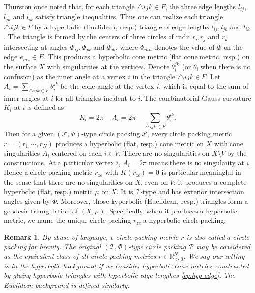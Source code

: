 \documentclass[12pt]{amsart}
\numberwithin{equation}{section}
\newtheorem{rem}[prop]{Remark}
\begin{document}
Thurston once noted \cite[Lemma~13.7.2]{Thurston} that, for each triangle $\triangle ijk \in F$, the three edge lengths $l_{ij}$,
$l_{jk}$ and $l_{ik}$ satisfy triangle inequalities. Thus one can realize each triangle $\triangle ijk \in F$ by a hyperbolic
(Euclidean, resp.) triangle of edge lengths $l_{ij}, l_{jk}$ and $l_{ik}$. The triangle is formed by the centers of three
circles of radii $r_i, r_j$ and $r_k$ intersecting at angles $\Phi_{ij}, \Phi_{jk}$ and $\Phi_{ik}$, where $\Phi_{mn}$ denotes the value of $\Phi$
on the edge $e_{mn} \in E$. This produces a hyperbolic cone metric (flat cone metric, resp.) on the surface
$X$ with singularities at the vertices. Denote $\theta_i^{jk}$ (or $\theta_i$ when there is no confusion) as the inner angle at
a vertex $i$ in the triangle $\triangle ijk \in F$. Let $A_i = \sum_{\triangle ijk \in F} \theta_i^{jk}$ be the cone angle at the vertex $i$, which is
equal to the sum of inner angles at $i$ for all triangles incident to $i$. The combinatorial Gauss curvature
$K_i$ at $i$ is defined as
\begin{equation}\label{eq:curvature}
K_i = 2\pi - A_i = 2\pi - \sum_{\triangle ijk \in F} \theta_i^{jk}.
\end{equation}
Then for a given $(\mathcal{T},\Phi)$-type circle packing $\mathcal{P}$, every circle packing metric $r = (r_1, \cdots, r_N)$ produces a
hyperbolic (flat, resp.) cone metric on $X$ with cone singularities $A_i$ centered on each $i \in V$. There are no
singularities on $X \setminus V$ by the constructions. At a particular vertex $i$, $A_i = 2\pi$ means there is no singularity
at $i$. Hence a circle packing metric $r_{ze}$ with $K(r_{ze}) = 0$ is particular meaningful in the sense that there
are no singularities on $X$, even on $V$: it produces a complete hyperbolic (flat, resp.) metric $\mu$ on $X$. It
is $\mathcal{T}$-type and has exterior intersection angles given by $\Phi$. Moreover, those hyperbolic (Euclidean, resp.)
triangles form a geodesic triangulation of $(X,\mu)$. Specifically, when it produces a hyperbolic metric, we
name the unique circle packing $r_{ze}$ a hyperbolic circle packing.

\begin{rem}
By abuse of language, a circle packing metric $r$ is also called a circle packing for brevity.
The original $(\mathcal{T},\Phi)$-type circle packing $\mathcal{P}$ may be considered as the equivalent class of all circle packing
metrics $r \in \mathbb{R}^N_{>0}$. We say our setting is in the hyperbolic background if we consider hyperbolic cone
metrics constructed by gluing hyperbolic triangles with hyperbolic edge lengthes \eqref{eq:hyp-edge}. The Euclidean
background is defined similarly.
\end{rem}
\end{document}
